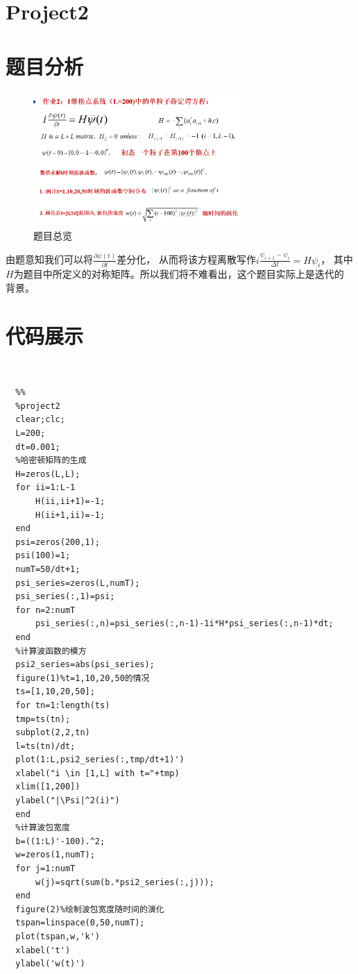\documentclass[UTF8,a4paper,10pt]{ctexart}
\begin{document}
\section*{Project2}
\section{题目分析}
\begin{figure}[!htbp]
  \centering
  \includegraphics[width=0.7\textwidth,height=0.55\textwidth]{pictures/project2.png}
  \caption{题目总览} \label{project2}
\end{figure}
由题意知我们可以将$\frac{\partial \psi(t)}{\partial t}$差分化，
从而将该方程离散写作$i\frac{\psi_{i+1}-\psi_{i}}{\Delta t}=H\psi_{i}$，
其中$H$为题目中所定义的对称矩阵。所以我们将不难看出，这个题目实际上是迭代的
背景。\newline


\section{代码展示}
~\\
\lstset{language=matlab}
\begin{lstlisting}
  %%
  %project2
  clear;clc;
  L=200;
  dt=0.001;
  %哈密顿矩阵的生成
  H=zeros(L,L);
  for ii=1:L-1
      H(ii,ii+1)=-1;
      H(ii+1,ii)=-1;
  end
  psi=zeros(200,1);
  psi(100)=1;
  numT=50/dt+1;
  psi_series=zeros(L,numT);
  psi_series(:,1)=psi;
  for n=2:numT
      psi_series(:,n)=psi_series(:,n-1)-1i*H*psi_series(:,n-1)*dt;
  end
  %计算波函数的模方
  psi2_series=abs(psi_series);
  figure(1)%t=1,10,20,50的情况
  ts=[1,10,20,50];
  for tn=1:length(ts)
  tmp=ts(tn);
  subplot(2,2,tn)
  l=ts(tn)/dt;
  plot(1:L,psi2_series(:,tmp/dt+1)')
  xlabel("i \in [1,L] with t="+tmp)
  xlim([1,200])
  ylabel("|\Psi|^2(i)")
  end
  %计算波包宽度
  b=((1:L)'-100).^2;
  w=zeros(1,numT);
  for j=1:numT
      w(j)=sqrt(sum(b.*psi2_series(:,j)));
  end
  figure(2)%绘制波包宽度随时间的演化
  tspan=linspace(0,50,numT);
  plot(tspan,w,'k')
  xlabel('t')
  ylabel('w(t)')
\end{lstlisting}
\end{document}
